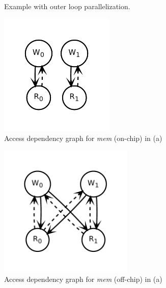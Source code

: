 \begin{figure}
\centering
\begin{subfigure}[b]{0.34\textwidth}
\inputminted{python}{code/dep1.py}
\caption {
  Example with outer loop parallelization.
}
\end{subfigure}
\hfill
\begin{subfigure}[b]{0.3\textwidth}
  \centering
\includegraphics[width=0.6\textwidth]{figs/dep1.pdf}
\caption{
  Access dependency graph for \emph{mem} (on-chip) in (a)
}
\end{subfigure}
\hfill
\begin{subfigure}[b]{0.3\textwidth}
  \centering
\includegraphics[width=0.7\textwidth]{figs/dep2.pdf}
\caption{
  Access dependency graph for \emph{mem} (off-chip) in (a)
}
\end{subfigure}
\\
\begin{subfigure}[b]{0.4\textwidth}

\end{subfigure}
\end{figure}
